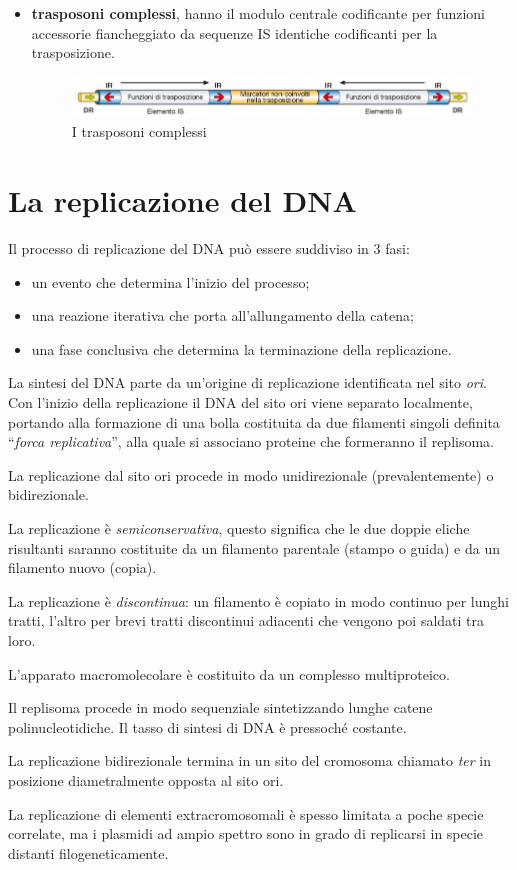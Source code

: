 \documentclass[11pt]{book}
\begin{document}
\begin{itemize}
\clearpage
\item \textbf{trasposoni complessi}, hanno il modulo centrale codificante per funzioni accessorie fiancheggiato da sequenze IS identiche codificanti per la trasposizione.

\begin{figure}[htp]
\centering
\includegraphics[scale=0.4]{img/Trasposoni complessi.png}
\caption{I trasposoni complessi}
\label{}
\end{figure}

\end{itemize}


\section{La replicazione del DNA} 
Il processo di replicazione del DNA può essere suddiviso in 3 fasi:
\begin{itemize}
\item un evento che determina l’inizio del processo;
\item una reazione iterativa che porta all’allungamento della catena;
\item una fase conclusiva che determina la terminazione della replicazione.
\end{itemize}

La sintesi del DNA parte da un'origine di replicazione identificata nel sito \emph{ori}. Con l’inizio della replicazione il DNA del sito ori viene separato localmente, portando alla formazione di una bolla costituita da due filamenti singoli definita ``\emph{forca replicativa}'', alla quale si associano proteine che formeranno il replisoma.

La replicazione dal sito ori procede in modo unidirezionale (prevalentemente) o bidirezionale.

La replicazione è \emph{semiconservativa}, questo significa che le due doppie eliche risultanti saranno costituite da un filamento parentale (stampo o guida) e da un filamento nuovo (copia).

La replicazione è \emph{discontinua}: un filamento è copiato in modo continuo per lunghi tratti, l’altro per brevi tratti discontinui adiacenti che vengono poi saldati tra loro.

L’apparato macromolecolare è costituito da un complesso multiproteico.

Il replisoma procede in modo sequenziale sintetizzando lunghe catene polinucleotidiche. Il tasso di sintesi di DNA è pressoché costante.

La replicazione bidirezionale termina in un sito del cromosoma chiamato \emph{ter} in posizione diametralmente opposta al sito ori.

La replicazione di elementi extracromosomali è spesso limitata a poche specie correlate, ma i plasmidi ad ampio spettro sono in grado di replicarsi in specie 
distanti filogeneticamente.
\end{document}
